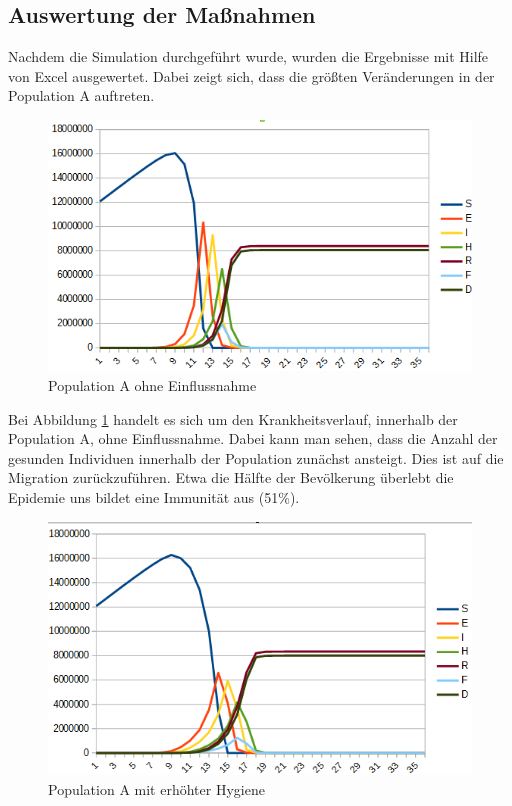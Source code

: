 \subsection{Auswertung der Maßnahmen}
\ellen
Nachdem die Simulation durchgeführt wurde, wurden die Ergebnisse mit Hilfe von Excel ausgewertet. Dabei zeigt sich, dass die größten Veränderungen in der Population A auftreten.\\
\begin{figure}
 \includegraphics[width=1\textwidth]{massnahmen/A0}
\caption{Population A ohne Einflussnahme}
\label{fig:ssec:actions:A0}
\end{figure}
 Bei Abbildung \ref{fig:ssec:actions:A0} handelt es sich um den Krankheitsverlauf, innerhalb der Population A, ohne Einflussnahme. Dabei kann man sehen, dass die Anzahl der gesunden Individuen innerhalb der Population zunächst ansteigt. Dies ist auf die Migration zurückzuführen. Etwa die Hälfte der Bevölkerung überlebt die Epidemie uns bildet eine Immunität aus (51\%).\\
 \begin{figure}
 \includegraphics[width=1\textwidth]{massnahmen/A1}
\caption{Population A mit erhöhter Hygiene}
\label{fig:ssec:actions:A1}
\end{figure}
